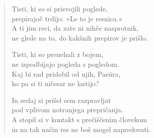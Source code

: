 \begin{verse}
Tisti, ki so si prisvojili poglede,\\
prepirajoč trdijo: »Le to je resnica.«\\
A ti jim reci, da zate ni nihče nasprotnik,\\
ne glede na to, do kakšnih prepirov je prišlo.

Tisti, ki so prenehali z bojem,\\
ne izpodbijajo pogleda s pogledom.\\
Kaj bi rad pridobil od njih, Pasūra,\\
ko pa si ti ničesar ne lastijo?

In sedaj si prišel sem razpravljat\\
pod vplivom notranjega prepričanja.\\
A stopil si v kontakt s prečiščenim človekom\\
in na tak način res ne boš mogel napredovati.

\end{verse}


\clearpage
\begin{verse}


\end{verse}


\clearpage
\begin{verse}


\end{verse}

